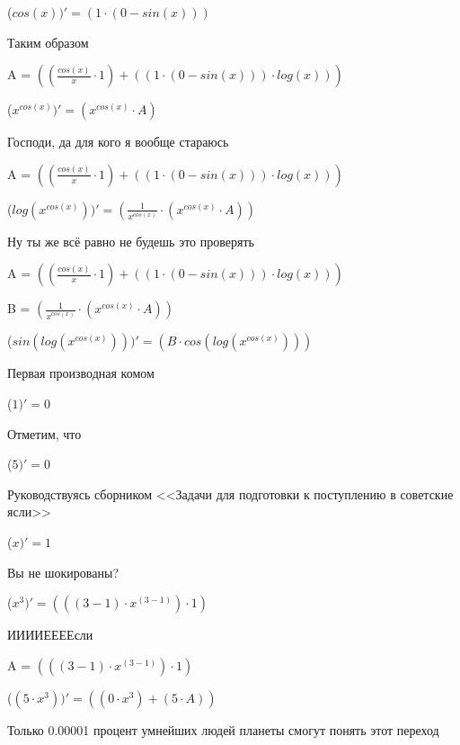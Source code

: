 \documentclass[12pt,a4paper,fleqn]{article}
\begin{document}
\begin{center}
 ($cos(x))'
  = (1 \cdot (0-sin(x)))$\end{center}
Таким образом

\begin{center}
A = $((\frac{cos(x)}{x} \cdot 1)+((1 \cdot (0-sin(x))) \cdot log(x)))$\end{center}
\begin{center}
 ($x^{cos(x)})'
  = (x^{cos(x)} \cdot A)$\end{center}
Господи, да для кого я вообще стараюсь

\begin{center}
A = $((\frac{cos(x)}{x} \cdot 1)+((1 \cdot (0-sin(x))) \cdot log(x)))$\end{center}
\begin{center}
 ($log(x^{cos(x)}))'
  = (\frac{1}{x^{cos(x)}} \cdot (x^{cos(x)} \cdot A))$\end{center}
Ну ты же всё равно не будешь это проверять

\begin{center}
A = $((\frac{cos(x)}{x} \cdot 1)+((1 \cdot (0-sin(x))) \cdot log(x)))$\end{center}
\begin{center}
B = $(\frac{1}{x^{cos(x)}} \cdot (x^{cos(x)} \cdot A))$\end{center}
\begin{center}
 ($sin(log(x^{cos(x)})))'
  = (B \cdot cos(log(x^{cos(x)})))$\end{center}
Первая производная комом

\begin{center}
 ($1)'
  = 0$\end{center}
Отметим, что

\begin{center}
 ($5)'
  = 0$\end{center}
Руководствуясь сборником <<Задачи для подготовки к поступлению в советские ясли>>

\begin{center}
 ($x)'
  = 1$\end{center}
Вы не шокированы?

\begin{center}
 ($x^{3})'
  = (((3-1) \cdot x^{(3-1)}) \cdot 1)$\end{center}
ИИИИЕЕЕЕсли

\begin{center}
A = $(((3-1) \cdot x^{(3-1)}) \cdot 1)$\end{center}
\begin{center}
 ($(5 \cdot x^{3}))'
  = ((0 \cdot x^{3})+(5 \cdot A))$\end{center}
Только 0.00001 процент умнейших людей планеты смогут понять этот переход
\end{document}
